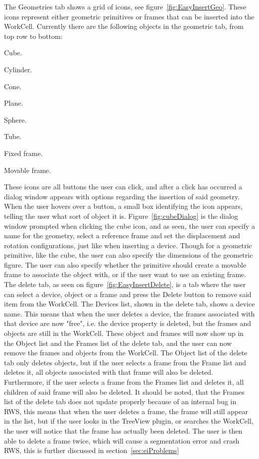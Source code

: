 The Geometries tab shows a grid of icons, see figure~\ref{fig:EasyInsertGeo}. These icons represent either geometric primitives or frames that can be inserted into the WorkCell. Currently there are the following objects in the geometric tab, from top row to bottom:
\begin{enumerate*}[font={\color{red!50!black}\bfseries}]
\item Cube.
\item Cylinder.
\item Cone.
\item Plane.
\item Sphere.
\item Tube.
\item Fixed frame.
\item Movable frame.
\end{enumerate*}
These icons are all buttons the user can click, and after a click has occurred a dialog window appears with options regarding the insertion of said geometry. When the user hovers over a button, a small box identifying the icon appears, telling the user what sort of object it is. Figure~\ref{fig:cubeDialog} is the dialog window prompted when clicking the cube icon, and as seen, the user can specify a name for the geometry, select a reference frame and set the displacement and rotation configurations, just like when inserting a device. Though for a geometric primitive, like the cube, the user can also specify the dimensions of the geometric figure. The user can also specify whether the primitive should create a movable frame to associate the object with, or if the user want to use an existing frame.\\

The delete tab, as seen on figure~\ref{fig:EasyInsertDelete}, is a tab where the user can select a device, object or a frame and press the Delete button to remove said item from the WorkCell. The Devices list, shown in the delete tab, shows a device name. This means that when the user deletes a device, the frames associated with that device are now "free", i.e. the device property is deleted, but the frames and objects are still in the WorkCell. These object and frames will now show up in the Object list and the Frames list of the delete tab, and the user can now remove the frames and objects from the WorkCell. The Object list of the delete tab only deletes objects, but if the user selects a frame from the Frame list and deletes it, all objects associated with that frame will also be deleted. Furthermore, if the user selects a frame from the Frames list and deletes it, all children of said frame will also be deleted. It should be noted, that the Frames list of the delete tab does not update properly because of an internal bug in RWS, this means that when the user deletes a frame, the frame will still appear in the list, but if the user looks in the TreeView plugin, or searches the WorkCell, the user will notice that the frame has actually been deleted. The user is then able to delete a frame twice, which will cause a segmentation error and crash RWS, this is further discussed in section~\ref{sec:eiProblems}

